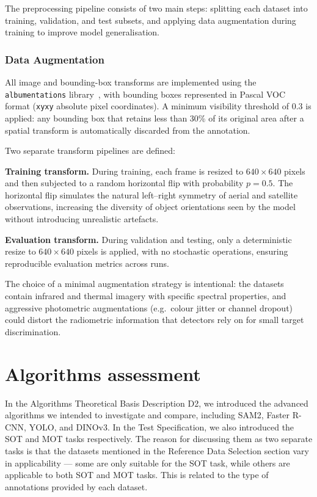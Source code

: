 \documentclass[
]{article}
\begin{document}
The preprocessing pipeline consists of two main steps: splitting each dataset into training, validation, and test subsets, and applying data augmentation during training to improve model generalisation.


\subsubsection*{Data Augmentation}

All image and bounding-box transforms are implemented using the \texttt{albumentations} library~\cite{albumentations}, with bounding boxes represented in Pascal VOC format (\texttt{xyxy} absolute pixel coordinates). A minimum visibility threshold of 0.3 is applied: any bounding box that retains less than 30\% of its original area after a spatial transform is automatically discarded from the annotation.

Two separate transform pipelines are defined:

\textbf{Training transform.} During training, each frame is resized to $640 \times 640$ pixels and then subjected to a random horizontal flip with probability $p = 0.5$. The horizontal flip simulates the natural left--right symmetry of aerial and satellite observations, increasing the diversity of object orientations seen by the model without introducing unrealistic artefacts.

\textbf{Evaluation transform.} During validation and testing, only a deterministic resize to $640 \times 640$ pixels is applied, with no stochastic operations, ensuring reproducible evaluation metrics across runs.

The choice of a minimal augmentation strategy is intentional: the datasets contain infrared and thermal imagery with specific spectral properties, and aggressive photometric augmentations (e.g.\ colour jitter or channel dropout) could distort the radiometric information that detectors rely on for small target discrimination.

\hypertarget{algorithms-assessment}{%
\section{Algorithms assessment}\label{algorithms-assessment}}

In the Algorithms Theoretical Basis Description D2, we introduced the advanced algorithms we intended to investigate and compare, including SAM2, Faster R-CNN, YOLO, and DINOv3. 
In the Test Specification, we also introduced the SOT and MOT tasks respectively. 
The reason for discussing them as two separate tasks is that the datasets mentioned in the Reference Data Selection section vary in applicability — some are only suitable for the SOT task, while others are applicable to both SOT and MOT tasks. 
This is related to the type of annotations provided by each dataset.
\end{document}
